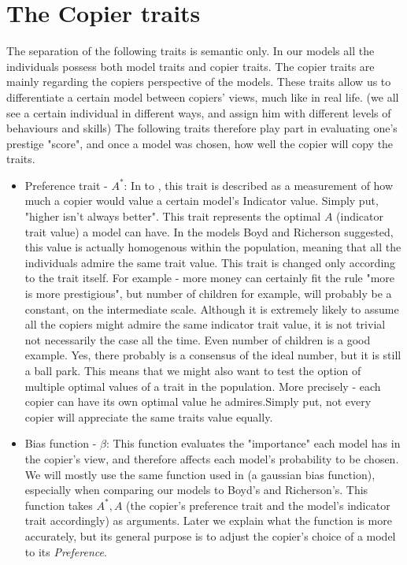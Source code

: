 \documentclass[11pt]{article}
\begin{document}
 \section{The Copier traits} \label{copier traits}
 
 The separation of the following traits is semantic only. In our models all the individuals possess both model traits and copier traits. The copier traits are mainly regarding the copiers perspective of the models. These traits allow us to differentiate a certain model between copiers' views, much like in real life. (we all see a certain individual in different ways, and assign him with different levels of behaviours and skills)
 The following traits therefore play part in evaluating one's prestige "score", and once a model was chosen, how well the copier will copy the traits.
 \begin{itemize}
 
 \item Preference trait - $A^*$: In to \cite{evolutionBook}, this trait is described as a measurement of how much a copier would value a certain model's Indicator value. Simply put, "higher isn't always better". This trait represents the optimal $A$ (indicator trait value) a model can have. In the models Boyd and Richerson suggested, this value is actually homogenous within the population, meaning that all the individuals admire the same trait value. This trait is changed only according to the trait itself. For example - more money can certainly fit the rule "more is more prestigious", but number of children for example, will probably be a constant, on the intermediate scale. Although it is extremely likely to assume all the copiers might admire the same indicator trait value, it is not trivial not necessarily the case all the time. Even number of children is a good example. Yes, there probably is a consensus of the ideal number, but it is still a ball park. This means that we might also want to test the option of multiple optimal values of a trait in the population. More precisely - each copier can have its own optimal value he admires.Simply put, not every copier will appreciate the same traits value equally.
 
 \item Bias function - $\beta$: This function evaluates the "importance" each model has in the copier's view, and therefore affects each model's probability to be chosen. We will mostly use the same function used in \cite{evolutionBook} (a gaussian bias function), especially when comparing our models to Boyd's and Richerson's. This function takes $A^*,A$ (the copier's preference trait and the model's indicator trait accordingly) as arguments. Later we explain what the function is more accurately, but its general purpose is to adjust the copier's choice of a model to its \textit{Preference}.
  

\end{itemize}
\end{document}
